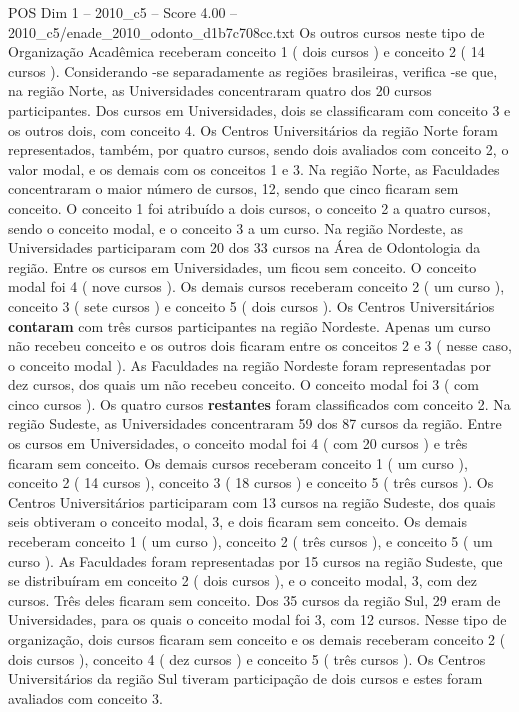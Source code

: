\begin{textsample}{POS Dim 1 – 2010\_c5 – Score 4.00 – 2010\_c5/enade\_2010\_odonto\_d1b7c708cc.txt}
Os outros cursos neste tipo de Organização Acadêmica receberam conceito 1 ( dois cursos ) e conceito 2 ( 14 cursos ).
Considerando -se separadamente as regiões brasileiras, verifica -se que, na região Norte, as Universidades concentraram quatro dos 20 cursos participantes.
Dos cursos em Universidades, dois se classificaram com conceito 3 e os outros dois, com conceito 4.
Os Centros Universitários da região Norte foram representados, também, por quatro cursos, sendo dois avaliados com conceito 2, o valor modal, e os demais com os conceitos 1 e 3.
Na região Norte, as Faculdades concentraram o maior número de cursos, 12, sendo que cinco ficaram sem conceito.
O conceito 1 foi atribuído a dois cursos, o conceito 2 a quatro cursos, sendo o conceito modal, e o conceito 3 a um curso.
Na região Nordeste, as Universidades participaram com 20 dos 33 cursos na Área de Odontologia da região.
Entre os cursos em Universidades, um ficou sem conceito.
O conceito modal foi 4 ( nove cursos ).
Os demais cursos receberam conceito 2 ( um curso ), conceito 3 ( sete cursos ) e conceito 5 ( dois cursos ).
Os Centros Universitários \textbf{contaram} com três cursos participantes na região Nordeste.
Apenas um curso não recebeu conceito e os outros dois ficaram entre os conceitos 2 e 3 ( nesse caso, o conceito modal ).
As Faculdades na região Nordeste foram representadas por dez cursos, dos quais um não recebeu conceito.
O conceito modal foi 3 ( com cinco cursos ).
Os quatro cursos \textbf{restantes} foram classificados com conceito 2.
Na região Sudeste, as Universidades concentraram 59 dos 87 cursos da região.
Entre os cursos em Universidades, o conceito modal foi 4 ( com 20 cursos ) e três ficaram sem conceito.
Os demais cursos receberam conceito 1 ( um curso ), conceito 2 ( 14 cursos ), conceito 3 ( 18 cursos ) e conceito 5 ( três cursos ).
Os Centros Universitários participaram com 13 cursos na região Sudeste, dos quais seis obtiveram o conceito modal, 3, e dois ficaram sem conceito.
Os demais receberam conceito 1 ( um curso ), conceito 2 ( três cursos ), e conceito 5 ( um curso ).
As Faculdades foram representadas por 15 cursos na região Sudeste, que se distribuíram em conceito 2 ( dois cursos ), e o conceito modal, 3, com dez cursos.
Três deles ficaram sem conceito.
Dos 35 cursos da região Sul, 29 eram de Universidades, para os quais o conceito modal foi 3, com 12 cursos.
Nesse tipo de organização, dois cursos ficaram sem conceito e os demais receberam conceito 2 ( dois cursos ), conceito 4 ( dez cursos ) e conceito 5 ( três cursos ).
Os Centros Universitários da região Sul tiveram participação de dois cursos e estes foram avaliados com conceito 3.

\end{textsample}
